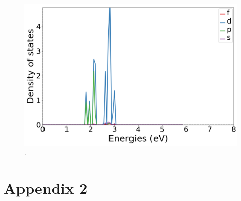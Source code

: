 \documentclass{article}
\begin{document}
  \begin{figure}[H]
      \centering
      \includegraphics[width = 11cm]{../fig/Yb_k4_LDOS26_2.png}
      \caption{. }
      \label{fig:Yb_k4_LDOS26_2.png}
  \end{figure}

\vspace{1cm}

\section{Appendix 2}

\end{document}

